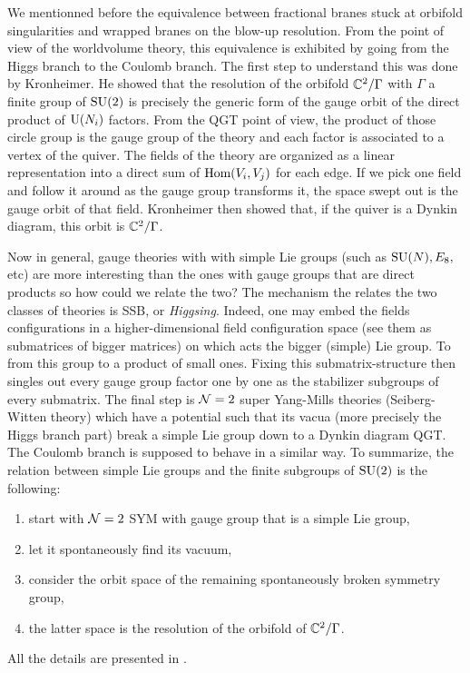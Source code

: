     We mentionned before the equivalence between fractional branes stuck at orbifold singularities and wrapped branes on the blow-up resolution. From the point of view of the worldvolume theory, this equivalence is exhibited by going from the Higgs branch to the Coulomb branch. The first step to understand this was done by Kronheimer. He showed that the resolution of the orbifold $\mathbb{C}^2/\Gamma$ with $\Gamma$ a finite group of $\text{SU}(2)$ is precisely the generic form of the gauge orbit of the direct product of $\text{U}(N_i)$ factors. From the QGT point of view, the product of those circle group is the gauge group of the theory and each factor is associated to a vertex of the quiver. The fields of the theory are organized as a linear representation into a direct sum of $\text{Hom}(V_i,V_j)$ for each edge. If we pick one field and follow it around as the gauge group transforms it, the space swept out is the gauge orbit of that field. Kronheimer then showed that, if the quiver is a Dynkin diagram, this orbit is $\mathbb{C}^2/\Gamma$. 
    
    Now in general, gauge theories with with simple Lie groups (such as $\text{SU}(N), E_8,$etc) are more interesting than the ones with gauge groups that are direct products so how could we relate the two? The mechanism the relates the two classes of theories is SSB, or \emph{Higgsing}. Indeed, one may embed the fields configurations in a higher-dimensional field configuration space (see them as submatrices of bigger matrices) on which acts the bigger (simple) Lie group. To from this group to a product of small ones. Fixing this submatrix-structure then singles out every gauge group factor one by one as the stabilizer subgroups of every submatrix. The final step is $\mathcal{N}=2$ super Yang-Mills theories (Seiberg-Witten theory) which have a potential such that its vacua (more precisely the Higgs branch part) break a simple Lie group down to a Dynkin diagram QGT. The Coulomb branch is supposed to behave in a similar way. To summarize, the relation between simple Lie groups and the finite subgroups of $\text{SU}(2)$ is the following:
    \begin{enumerate}
        \item start with $\mathcal{N}=2$ SYM with gauge group that is a simple Lie group,
        \item let it spontaneously find its vacuum,
        \item consider the orbit space of the remaining spontaneously broken symmetry group,
        \item the latter space is the resolution of the orbifold of $\mathbb{C}^2/\Gamma$.
    \end{enumerate}

    All the details are presented in \cite{albertssonthesis}.